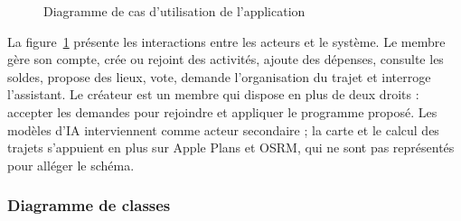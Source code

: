 \begin{figure}[H]
{}
\caption{Diagramme de cas d'utilisation de l'application}
\label{fig:cas_utilisation}
\end{figure}

La figure~\ref{fig:cas_utilisation} présente les interactions entre les acteurs et le
système. Le membre gère son compte, crée ou rejoint des activités, ajoute des dépenses,
consulte les soldes, propose des lieux, vote, demande l'organisation du trajet et
interroge l'assistant. Le créateur est un membre qui dispose en plus de deux droits :
accepter les demandes pour rejoindre et appliquer le programme proposé. Les modèles d'IA
interviennent comme acteur secondaire ; la carte et le calcul des trajets s'appuient en
plus sur Apple Plans et OSRM, qui ne sont pas représentés pour alléger le schéma.

\subsubsection{Diagramme de classes}

